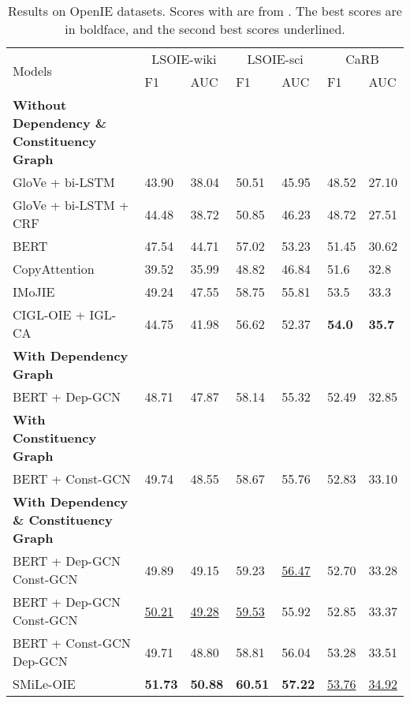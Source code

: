 \documentclass[11pt]{article}
\newcommand{\mname}{SMiLe-OIE\xspace}
\begin{document}
\begin{table*}
\centering
\begin{tabular}{l|ll|ll|ll}
 \toprule
 \multirow{2}{*}{Models} &
 \multicolumn{2}{c|}{LSOIE-wiki} &
 \multicolumn{2}{c|}{LSOIE-sci} &
 \multicolumn{2}{c}{CaRB} \\
  & F1 & AUC & F1 & AUC & F1 & AUC\\
 \midrule
 \textbf{Without Dependency \& Constituency Graph} & & & & & &\\
  GloVe + bi-LSTM~\cite{stanovsky2018supervised} & 43.90 & 38.04       & 50.51 & 45.95        & 48.52 & 27.10\\
  GloVe + bi-LSTM + CRF & 44.48 & 38.72         & 50.85 & 46.23        & 48.72 & 27.51\\
  BERT~\cite{solawetz-larson-2021-lsoie}  & 47.54 & 44.71         & 57.02 & 53.23        & 51.45 & 30.62\\
  CopyAttention~\cite{cui2018neural} & 39.52 & 35.99 & 48.82 & 46.84 & 51.6 & 32.8 \\
  IMoJIE~\cite{kolluru2020imojie}  & 49.24 & 47.55 & 58.75 & 55.81 & 53.5 & 33.3 \\
  CIGL-OIE + IGL-CA~\cite{kolluru2020openie6} & 44.75 & 41.98 & 56.62 & 52.37 & \textbf{54.0} & \textbf{35.7} \\
 \midrule
 \textbf{With Dependency Graph} & & & & & &\\
 BERT + Dep-GCN & 48.71 & 47.87        & 58.14 & 55.32        & 52.49 & 32.85\\

 \midrule
 \textbf{With Constituency Graph} & & & & & &\\
 BERT + Const-GCN & 49.74 & 48.55         & 58.67 & 55.76        & 52.83 & 33.10\\
 
 \midrule
 \textbf{With Dependency \& Constituency Graph} & & & & & &\\
 BERT + Dep-GCN  Const-GCN & 49.89 & 49.15        & 59.23 &  \underline{56.47}        & 52.70 & 33.28\\
 BERT + Dep-GCN  Const-GCN &  \underline{50.21} &  \underline{49.28}       &  \underline{59.53} & 55.92        & 52.85 & 33.37\\
 BERT + Const-GCN  Dep-GCN & 49.71 & 48.80         & 58.81 & 56.04       & 53.28 & 33.51\\
 \mname & \textbf{51.73} & \textbf{50.88} & \textbf{60.51} & \textbf{57.22} & \underline{53.76} & \underline{34.92} \\

 \bottomrule
\end{tabular}
\caption{Results on OpenIE datasets. Scores with  are from \citet{kolluru2020openie6}. The best scores are in boldface, and the second best scores underlined.}

\label{tab:baseline_systems}
\end{table*}
\end{document}
